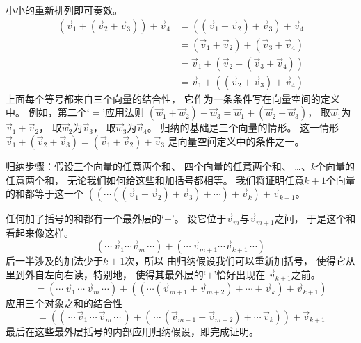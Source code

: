     \begin{answer}
      \begin{exparts}
        \partsitem 小小的重新排列即可奏效。
          \begin{align*}
            (\vec{v}_1+(\vec{v}_2+\vec{v}_3))+\vec{v}_4
            &=((\vec{v}_1+\vec{v}_2)+\vec{v}_3)+\vec{v}_4  \\
            &=(\vec{v}_1+\vec{v}_2)+(\vec{v}_3+\vec{v}_4)  \\
            &=\vec{v}_1+(\vec{v}_2+(\vec{v}_3+\vec{v}_4))  \\
            &=\vec{v}_1+((\vec{v}_2+\vec{v}_3)+\vec{v}_4)
          \end{align*}
          上面每个等号都来自三个向量的结合性，
          它作为一条条件写在向量空间的定义中。
          例如，第二个`$=$'应用法则
          $(\vec{w}_1+\vec{w}_2)+\vec{w}_3=\vec{w}_1+(\vec{w}_2+\vec{w}_3)$，
          取$\vec{w}_1$为$\vec{v}_1+\vec{v}_2$， 
          取$\vec{w}_2$为$\vec{v}_3$，
          取$\vec{w}_3$为$\vec{v}_4$。 
        \partsitem 归纳的基础是三个向量的情形。
          这一情形
          \( \vec{v}_1+(\vec{v}_2+\vec{v}_3)
          =(\vec{v}_1+\vec{v}_2)+\vec{v}_3 \)
          是向量空间定义中的条件之一。

          归纳步骤：假设三个向量的任意两个和、
          四个向量的任意两个和、
          \ldots、$k$个向量的任意两个和， 
          无论我们如何给这些和加括号都相等。
          我们将证明任意\( k+1 \)个向量的和都等于这一个
          \( ((\cdots((\vec{v}_1+\vec{v}_2)+\vec{v}_3)+\cdots)+\vec{v}_k)
              +\vec{v}_{k+1} \)。

          任何加了括号的和都有一个最外层的`\( + \)'。
          设它位于\( \vec{v}_m \)与\( \vec{v}_{m+1} \)之间，
          于是这个和看起来像这样。
          \begin{equation*}
            (\cdots\,\vec{v}_1\cdots\vec{v}_m\,\cdots)
           +(\cdots\,\vec{v}_{m+1}\cdots\vec{v}_{k+1}\,\cdots)
          \end{equation*}
          后一半涉及的加法少于$k+1$次，所以
          由归纳假设我们可以重新加括号，
          使得它从里到外自左向右读，特别地，
          使得其最外层的`$+$'恰好出现在 
          $\vec{v}_{k+1}$之前。
          \begin{equation*}
            =(\cdots\,\vec{v}_1\,\cdots\,\vec{v}_m\,\cdots)
             +((\cdots(\vec{v}_{m+1}+\vec{v}_{m+2})+\cdots+\vec{v}_{k})
                 +\vec{v}_{k+1})
          \end{equation*}
          应用三个对象之和的结合性
          \begin{equation*}
            =((\,\cdots\, \vec{v}_1\,\cdots\,\vec{v}_m\,\cdots\,)
             +(\,\cdots\,(\vec{v}_{m+1}+\vec{v}_{m+2})+\cdots\,\vec{v}_k))
             +\vec{v}_{k+1}
          \end{equation*}
          最后在这些最外层括号的内部应用归纳假设，即完成证明。
      \end{exparts}  
    \end{answer}
